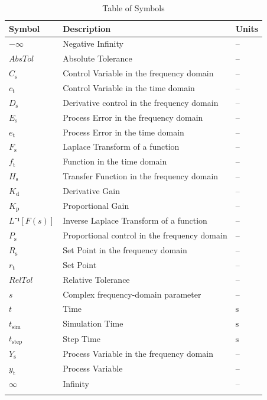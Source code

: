 \documentclass[12pt]{article}
\begin{document}
\begin{longtable}{l l l}
\toprule
\textbf{Symbol} & \textbf{Description} & \textbf{Units}
\\
\midrule
\endhead
$-∞$ & Negative Infinity & --
\\
$AbsTol$ & Absolute Tolerance & --
\\
${C_{\text{s}}}$ & Control Variable in the frequency domain & --
\\
${c_{\text{t}}}$ & Control Variable in the time domain & --
\\
${D_{\text{s}}}$ & Derivative control in the frequency domain & --
\\
${E_{\text{s}}}$ & Process Error in the frequency domain & --
\\
${e_{\text{t}}}$ & Process Error in the time domain & --
\\
${F_{\text{s}}}$ & Laplace Transform of a function & --
\\
${f_{\text{t}}}$ & Function in the time domain & --
\\
${H_{\text{s}}}$ & Transfer Function in the frequency domain & --
\\
${K_{\text{d}}}$ & Derivative Gain & --
\\
${K_{\text{p}}}$ & Proportional Gain & --
\\
$L⁻¹[F(s)]$ & Inverse Laplace Transform of a function & --
\\
${P_{\text{s}}}$ & Proportional control in the frequency domain & --
\\
${R_{\text{s}}}$ & Set Point in the frequency domain & --
\\
${r_{\text{t}}}$ & Set Point & --
\\
$RelTol$ & Relative Tolerance & --
\\
$s$ & Complex frequency-domain parameter & --
\\
$t$ & Time & ${\text{s}}$
\\
${t_{\text{sim}}}$ & Simulation Time & ${\text{s}}$
\\
${t_{\text{step}}}$ & Step Time & ${\text{s}}$
\\
${Y_{\text{s}}}$ & Process Variable in the frequency domain & --
\\
${y_{\text{t}}}$ & Process Variable & --
\\
$∞$ & Infinity & --
\\
\bottomrule
\caption{Table of Symbols}
\label{Table:ToS}
\end{longtable}
\end{document}
